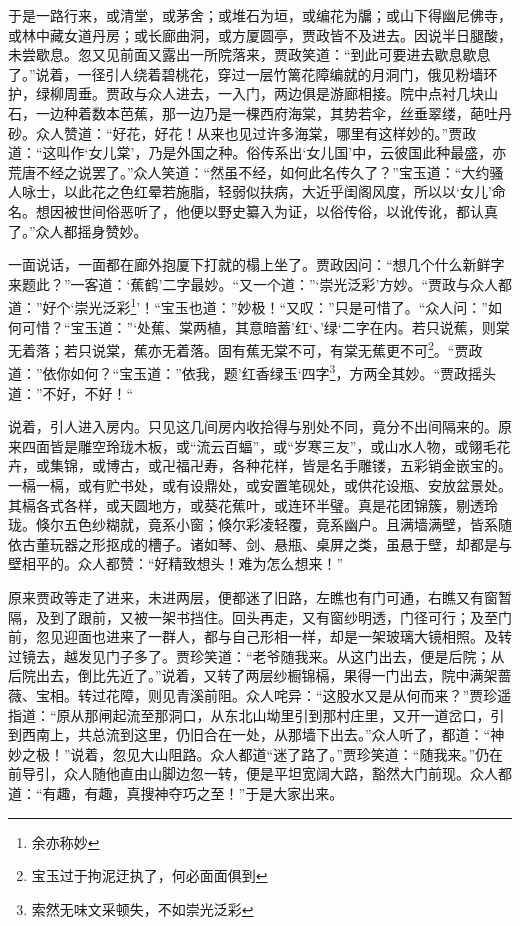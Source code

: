 \documentclass[12pt,oneside]{book}
\begin{document}
于是一路行来，或清堂，或茅舍；或堆石为垣，或编花为牖；或山下得幽尼佛寺，或林中藏女道丹房；或长廊曲洞，或方厦圆亭，贾政皆不及进去。因说半日腿酸，未尝歇息。忽又见前面又露出一所院落来，贾政笑道：“到此可要进去歇息歇息了。”说着，一径引人绕着碧桃花，穿过一层竹篱花障编就的月洞门，俄见粉墙环护，绿柳周垂。贾政与众人进去，一入门，两边俱是游廊相接。院中点衬几块山石，一边种着数本芭蕉，那一边乃是一棵西府海棠，其势若伞，丝垂翠缕，葩吐丹砂。众人赞道：“好花，好花！从来也见过许多海棠，哪里有这样妙的。”贾政道：“这叫作‘女儿棠’，乃是外国之种。俗传系出‘女儿国’中，云彼国此种最盛，亦荒唐不经之说罢了。”众人笑道：“然虽不经，如何此名传久了？”宝玉道：“大约骚人咏士，以此花之色红晕若施脂，轻弱似扶病，大近乎闺阁风度，所以以‘女儿’命名。想因被世间俗恶听了，他便以野史纂入为证，以俗传俗，以讹传讹，都认真了。”众人都摇身赞妙。

一面说话，一面都在廊外抱厦下打就的榻上坐了。贾政因问：“想几个什么新鲜字来题此？”一客道：‘蕉鹤’二字最妙。“又一个道：”‘崇光泛彩’方妙。“贾政与众人都道：”好个‘崇光泛彩\footnote{余亦称妙}’！“宝玉也道：”妙极！“又叹：”只是可惜了。“众人问：”如何可惜？“宝玉道：”‘处蕉、棠两植，其意暗蓄’红‘、’绿‘二字在内。若只说蕉，则棠无着落；若只说棠，蕉亦无着落。固有蕉无棠不可，有棠无蕉更不可\footnote{宝玉过于拘泥迂执了，何必面面俱到}。“贾政道：”依你如何？“宝玉道：”依我，题’红香绿玉‘四字\footnote{索然无味文采顿失，不如崇光泛彩}，方两全其妙。“贾政摇头道：”不好，不好！“

说着，引人进入房内。只见这几间房内收拾得与别处不同，竟分不出间隔来的。原来四面皆是雕空玲珑木板，或“流云百蝠”，或“岁寒三友”，或山水人物，或翎毛花卉，或集锦，或博古，或卍福卍寿，各种花样，皆是名手雕镂，五彩销金嵌宝的。一槅一槅，或有贮书处，或有设鼎处，或安置笔砚处，或供花设瓶、安放盆景处。其槅各式各样，或天圆地方，或葵花蕉叶，或连环半璧。真是花团锦簇，剔透玲珑。倏尔五色纱糊就，竟系小窗；倏尔彩凌轻覆，竟系幽户。且满墙满壁，皆系随依古董玩器之形抠成的槽子。诸如琴、剑、悬瓶、桌屏之类，虽悬于壁，却都是与壁相平的。众人都赞：“好精致想头！难为怎么想来！”

原来贾政等走了进来，未进两层，便都迷了旧路，左瞧也有门可通，右瞧又有窗暂隔，及到了跟前，又被一架书挡住。回头再走，又有窗纱明透，门径可行；及至门前，忽见迎面也进来了一群人，都与自己形相一样，却是一架玻璃大镜相照。及转过镜去，越发见门子多了。贾珍笑道：“老爷随我来。从这门出去，便是后院；从后院出去，倒比先近了。”说着，又转了两层纱橱锦槅，果得一门出去，院中满架蔷薇、宝相。转过花障，则见青溪前阻。众人咤异：“这股水又是从何而来？”贾珍遥指道：“原从那闸起流至那洞口，从东北山坳里引到那村庄里，又开一道岔口，引到西南上，共总流到这里，仍旧合在一处，从那墙下出去。”众人听了，都道：“神妙之极！”说着，忽见大山阻路。众人都道“迷了路了。”贾珍笑道：“随我来。”仍在前导引，众人随他直由山脚边忽一转，便是平坦宽阔大路，豁然大门前现。众人都道：“有趣，有趣，真搜神夺巧之至！”于是大家出来。
\end{document}
